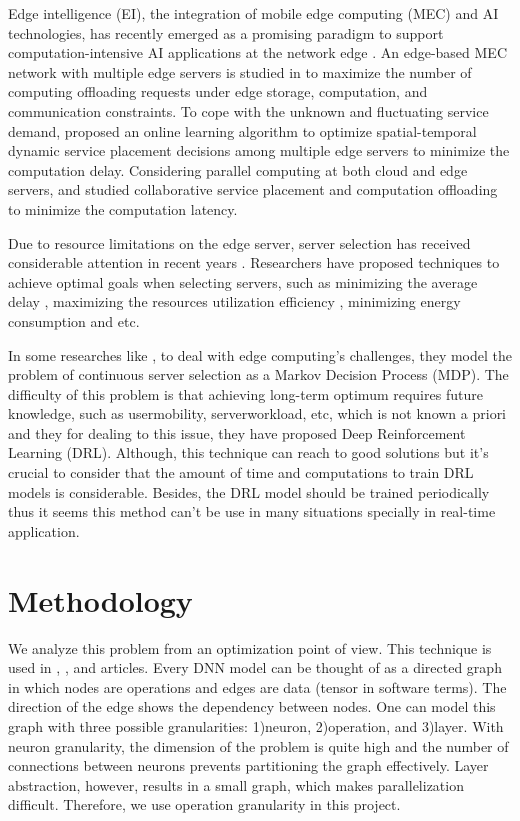 \documentclass[lettersize,journal]{IEEEtran}
\begin{document}
Edge intelligence (EI), the integration of mobile edge computing (MEC) and AI technologies, has recently emerged as a promising paradigm to support computation-intensive AI applications at the network edge \cite{9442308}.
An edge-based MEC network with multiple edge servers is studied in \cite{8737385} to maximize the number of computing offloading requests under edge storage, computation, and communication constraints. To cope with the unknown and fluctuating service demand,\cite{8509631} proposed an online learning algorithm to optimize spatial-temporal dynamic service placement decisions among multiple edge servers to minimize the computation delay. Considering parallel computing at both cloud and edge servers, \cite{xu2018joint} and \cite{chen2019collaborative} studied collaborative service placement and computation offloading to minimize the computation latency.

Due to resource limitations on the edge server, server selection has received considerable attention in recent years \cite{9599379}. 
Researchers have proposed techniques to achieve optimal goals when selecting servers, such as minimizing the average delay \cite{8972932},
maximizing the resources utilization efficiency \cite{8823875}, minimizing energy consumption \cite{li2020energy} and etc.

In some researches like \cite{liu2021deep}, to deal with edge computing's challenges, they model the problem of continuous server
selection as a Markov Decision Process (MDP). The difficulty of this problem is that achieving long-term optimum requires future knowledge, such as usermobility, serverworkload, etc, which is not known a priori and they for dealing to this issue, they have proposed  Deep Reinforcement Learning (DRL). Although, this technique can reach to good solutions but it's crucial to consider that the amount of time and computations to train DRL models is considerable. Besides, the DRL model should be trained periodically thus it seems this method can't be use in many situations specially in real-time application.

\section{Methodology}
We analyze this problem from an optimization point of view. This technique is used in \cite{DBLP:journals/corr/abs-2006-16423}, \cite{9527097}, and \cite{9512507} articles. Every DNN model can be thought of as a directed graph in which nodes are operations and edges are data (tensor in software terms). The direction of the edge shows the dependency between nodes. One can model this graph with three possible granularities: 1)neuron, 2)operation, and 3)layer. With neuron granularity, the dimension of the problem is quite high and the number of connections between neurons prevents partitioning the graph effectively. Layer abstraction, however, results in a small graph, which makes parallelization difficult. Therefore, we use operation granularity in this project. 
\end{document}
